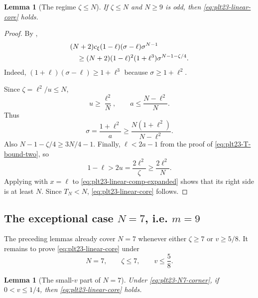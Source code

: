 \documentclass[11pt]{article}
\newtheorem{lemma}[theorem]{Lemma}
\numberwithin{equation}{section}
\begin{document}
\begin{lemma}[The regime $\zeta\le N$]\label{lem:plt23-linear-low-zeta}
  If $\zeta\le N$ and $N\ge9$ is odd, then
  \eqref{eq:plt23-linear-core} holds.
\end{lemma}

\begin{proof}
  By ,
  \begin{align}
    &(N+2)c_\xi(1-\ell)(\sigma-\ell)\sigma^{N-1}\notag\\
    &\quad\ge
    (N+2)(1-\ell)^2(1+\ell^3)
    \sigma^{N-1-\zeta/4}.
    \label{eq:plt23-linear-comp-expanded}
  \end{align}
  Indeed, $(1+\ell)(\sigma-\ell)\ge1+\ell^3$ because
  $\sigma\ge1+\ell^2$.

  Since $\zeta=\ell^2/u\le N$,
  \[
    u\ge\frac{\ell^2}{N},
    \qquad
    a\le\frac{N-\ell^2}{N}.
  \]
  Thus
  \begin{equation}\label{eq:plt23-sigma-lower-J}
    \sigma=\frac{1+\ell^2}{a}
    \ge\frac{N(1+\ell^2)}{N-\ell^2}.
  \end{equation}
  Also $N-1-\zeta/4\ge3N/4-1$.  Finally,
  $\ell<2a-1$ from the proof of \eqref{eq:plt23-T-bound-two}, so
  \[
    1-\ell>2u=\frac{2\ell^2}{\zeta}
    \ge\frac{2\ell^2}{N}.
  \]
  Applying  with $x=\ell$ to
  \eqref{eq:plt23-linear-comp-expanded} shows that its right side is at least
  $N$.  Since $T_N<N$, \eqref{eq:plt23-linear-core} follows.
\end{proof}

\subsection{The exceptional case \texorpdfstring{$N=7$, i.e. $m=9$}{N=7, i.e. m=9}}

The preceding lemmas already cover $N=7$ whenever either
$\zeta\ge7$ or $v\ge5/8$.  It remains to prove
\eqref{eq:plt23-linear-core} under
\begin{equation}\label{eq:plt23-N7-corner}
  N=7,
  \qquad \zeta\le7,
  \qquad v\le\frac{5}{8}.
\end{equation}

\begin{lemma}[The small-$v$ part of $N=7$]\label{lem:plt23-N7-small-v}
  Under \eqref{eq:plt23-N7-corner}, if $0<v\le1/4$, then
  \eqref{eq:plt23-linear-core} holds.
\end{lemma}
\end{document}

